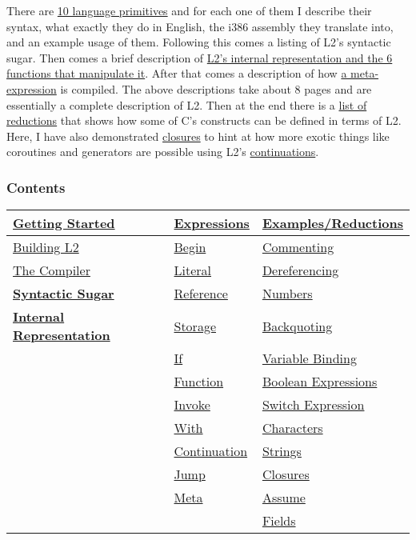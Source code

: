 \documentclass[]{article}
\begin{document}
There are \protect\hyperlink{expressions}{10 language primitives} and
for each one of them I describe their syntax, what exactly they do in
English, the i386 assembly they translate into, and an example usage of
them. Following this comes a listing of L2's syntactic sugar. Then comes
a brief description of \protect\hyperlink{internal-representation}{L2's
internal representation and the 6 functions that manipulate it}. After
that comes a description of how \protect\hyperlink{meta}{a
meta-expression} is compiled. The above descriptions take about 8 pages
and are essentially a complete description of L2. Then at the end there
is a \protect\hyperlink{examplesreductions}{list of reductions} that
shows how some of C's constructs can be defined in terms of L2. Here, I
have also demonstrated \protect\hyperlink{closures}{closures} to hint at
how more exotic things like coroutines and generators are possible using
L2's \protect\hyperlink{jump}{continuations}.

\hypertarget{contents}{%
\subsubsection{Contents}\label{contents}}

\begin{longtable}[]{@{}lll@{}}
\toprule
\textbf{\protect\hyperlink{getting-started}{Getting Started}} &
\protect\hyperlink{expressions}{Expressions} &
\protect\hyperlink{examplesreductions}{Examples/Reductions}\tabularnewline
\midrule
\endhead
\protect\hyperlink{building-l2}{Building L2} &
\protect\hyperlink{begin}{Begin} &
\protect\hyperlink{commenting}{Commenting}\tabularnewline
\protect\hyperlink{the-compiler}{The Compiler} &
\protect\hyperlink{literal}{Literal} &
\protect\hyperlink{dereferencing}{Dereferencing}\tabularnewline
\textbf{\protect\hyperlink{syntactic-sugar}{Syntactic Sugar}} &
\protect\hyperlink{reference}{Reference} &
\protect\hyperlink{numbers}{Numbers}\tabularnewline
\textbf{\protect\hyperlink{internal-representation}{Internal
Representation}} & \protect\hyperlink{storage}{Storage} &
\protect\hyperlink{backquoting}{Backquoting}\tabularnewline
& \protect\hyperlink{if}{If} &
\protect\hyperlink{variable-binding}{Variable Binding}\tabularnewline
& \protect\hyperlink{function}{Function} &
\protect\hyperlink{boolean-expressions}{Boolean
Expressions}\tabularnewline
& \protect\hyperlink{invoke}{Invoke} &
\protect\hyperlink{switch-expression}{Switch Expression}\tabularnewline
& \protect\hyperlink{with}{With} &
\protect\hyperlink{characters}{Characters}\tabularnewline
& \protect\hyperlink{continuation}{Continuation} &
\protect\hyperlink{strings}{Strings}\tabularnewline
& \protect\hyperlink{jump}{Jump} &
\protect\hyperlink{closures}{Closures}\tabularnewline
& \protect\hyperlink{meta}{Meta} &
\protect\hyperlink{assume}{Assume}\tabularnewline
& & \protect\hyperlink{fields}{Fields}\tabularnewline
\bottomrule
\end{longtable}
\end{document}
